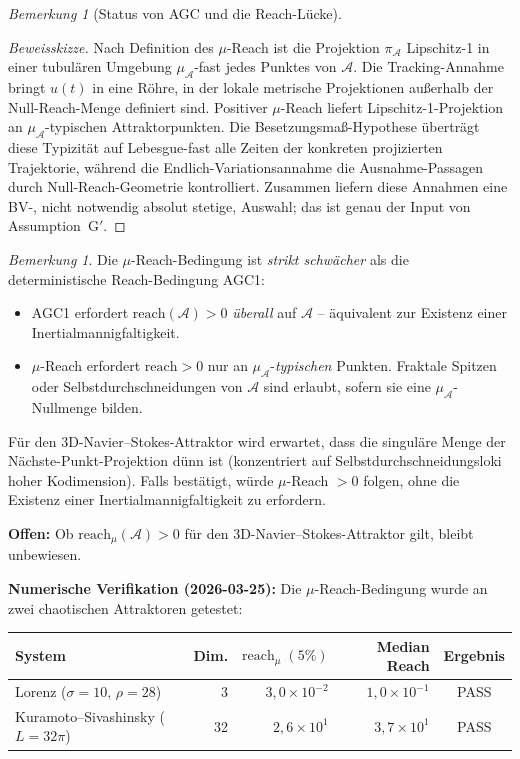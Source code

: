 \documentclass[12pt,a4paper]{article}
\theoremstyle{definition}
\theoremstyle{plain}
\theoremstyle{remark}
\newtheorem{remark}[definition]{Bemerkung}
\begin{document}
\begin{remark}[Status von AGC und die Reach-Lücke]
\begin{proof}[Beweisskizze]
Nach Definition des $\mu$-Reach ist die Projektion $\pi_{\mathcal{A}}$
Lipschitz-1 in einer tubulären Umgebung $\mu_{\mathcal{A}}$-fast
jedes Punktes von $\mathcal{A}$.
Die Tracking-Annahme bringt $u(t)$ in eine Röhre, in der lokale
metrische Projektionen außerhalb der Null-Reach-Menge definiert sind.
Positiver $\mu$-Reach liefert Lipschitz-1-Projektion an
$\mu_{\mathcal{A}}$-typischen Attraktorpunkten. Die
Besetzungsmaß-Hypothese überträgt diese Typizität auf
Lebesgue-fast alle Zeiten der konkreten projizierten Trajektorie,
während die Endlich-Variationsannahme die Ausnahme-Passagen durch
Null-Reach-Geometrie kontrolliert. Zusammen liefern diese Annahmen
eine BV-, nicht notwendig absolut stetige, Auswahl; das ist genau der
Input von Assumption~G$'$.
\end{proof}

\begin{remark}\label{rem:mu-reach-advantage}
Die $\mu$-Reach-Bedingung ist \emph{strikt schwächer} als die deterministische
Reach-Bedingung AGC1:
\begin{itemize}
\item AGC1 erfordert $\mathrm{reach}(\mathcal{A}) > 0$ \emph{überall}
  auf $\mathcal{A}$ -- äquivalent zur Existenz einer Inertialmannigfaltigkeit.
\item $\mu$-Reach erfordert $\mathrm{reach} > 0$ nur an
  $\mu_{\mathcal{A}}$-\emph{typischen} Punkten.
  Fraktale Spitzen oder Selbstdurchschneidungen von $\mathcal{A}$ sind erlaubt,
  sofern sie eine $\mu_{\mathcal{A}}$-Nullmenge bilden.
\end{itemize}
Für den 3D-Navier--Stokes-Attraktor wird erwartet, dass die singuläre Menge der
Nächste-Punkt-Projektion dünn ist
(konzentriert auf Selbstdurchschneidungsloki hoher Kodimension).
Falls bestätigt, würde $\mu$-Reach $> 0$ folgen, ohne
die Existenz einer Inertialmannigfaltigkeit zu erfordern.

\textbf{Offen:} Ob $\mathrm{reach}_\mu(\mathcal{A}) > 0$ für den
3D-Navier--Stokes-Attraktor gilt, bleibt unbewiesen.

\textbf{Numerische Verifikation (2026-03-25):}
Die $\mu$-Reach-Bedingung wurde an zwei chaotischen Attraktoren getestet:

\begin{center}
\small
\begin{tabular}{l|r|r|r|c}
\textbf{System} & \textbf{Dim.} & $\mathrm{reach}_\mu\;(5\%)$ & \textbf{Median Reach} & \textbf{Ergebnis} \\
\hline
Lorenz ($\sigma{=}10,\,\rho{=}28$) & 3 & $3{,}0 \times 10^{-2}$ & $1{,}0 \times 10^{-1}$ & PASS \\
Kuramoto--Sivashinsky ($L{=}32\pi$) & 32 & $2{,}6 \times 10^{1}$ & $3{,}7 \times 10^{1}$ & PASS
\end{tabular}
\end{center}


\end{remark}
\end{remark}
\end{document}
